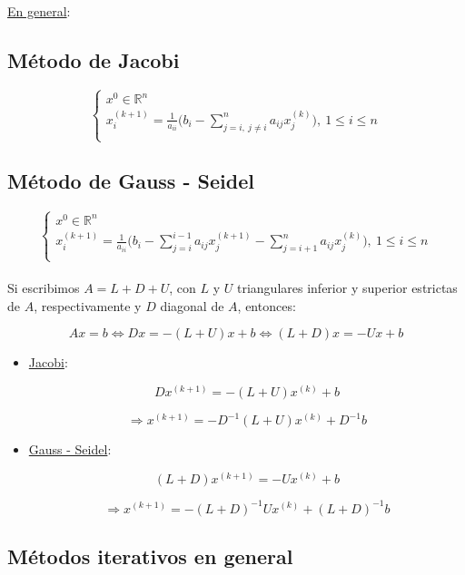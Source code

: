\underline{En general}:

\subsection{M\'etodo de Jacobi}

$$ 
	\begin{cases}
		x^{0} \in \mathbb{R}^{n}\\
		x_{i}^{(k + 1)} = \frac{1}{a_{ii}}\bigg(b_{i} - \sum \limits_{j = i,\ j \neq i}^{n} a_{ij}x_{j}^{(k)} \bigg),\ 1 \leq i \leq n\\
    \end{cases}
$$

\subsection{M\'etodo de Gauss - Seidel}

$$ 
	\begin{cases}
		x^{0} \in \mathbb{R}^{n}\\
		x_{i}^{(k + 1)} = \frac{1}{a_{ii}}\bigg(b_{i} - \sum \limits_{j = i}^{i - 1} a_{ij}x_{j}^{(k + 1)} - \sum \limits_{j = i + 1}^{n} a_{ij}x_{j}^{(k)} \bigg),\ 1 \leq i \leq n\\
    \end{cases}
$$\\

Si escribimos $A = L + D + U$, con $L$ y $U$ triangulares inferior y superior estrictas de $A$, respectivamente y $D$ diagonal de $A$, entonces:

$$Ax = b \iff Dx = -(L + U)x + b \iff (L + D)x = -Ux + b$$

\begin{itemize}
	\item \underline{Jacobi}:
	
	$$Dx^{(k + 1)} = -(L + U)x^{(k)} + b$$
	
	$$\Rightarrow x^{(k + 1)} = -D^{-1}(L + U)x^{(k)} + D^{-1}b$$
	
	\item \underline{Gauss - Seidel}:
	
	$$(L + D)x^{(k + 1)} = -Ux^{(k)} + b$$
	
	$$\Rightarrow x^{(k + 1)} = -(L + D)^{-1}Ux^{(k)} + (L + D)^{-1}b$$
\end{itemize}

\subsection{M\'etodos iterativos en general}

